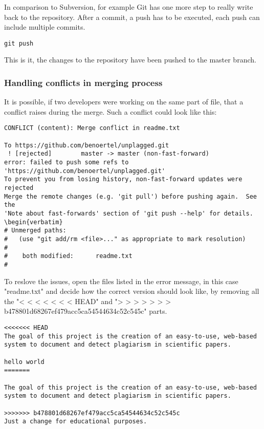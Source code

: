 In comparison to Subversion, for example Git has one more step to really write back to the repository. After a commit, 
a push has to be executed, each push can include multiple commits.

\begin{lstlisting}[caption=Creating branches]
git push
\end{lstlisting}

This is it, the changes to the repository have been pushed to the master branch.

\subsubsection{Handling conflicts in merging process}
It is possible, if two developers were working on the same part of  file, that a conflict raises during the merge. Such 
a conflict could look like this:

\begin{verbatim}
CONFLICT (content): Merge conflict in readme.txt

To https://github.com/benoertel/unplagged.git
 ! [rejected]        master -> master (non-fast-forward)
error: failed to push some refs to 'https://github.com/benoertel/unplagged.git'
To prevent you from losing history, non-fast-forward updates were rejected
Merge the remote changes (e.g. 'git pull') before pushing again.  See the
'Note about fast-forwards' section of 'git push --help' for details.
\begin{verbatim}
# Unmerged paths:
#   (use "git add/rm <file>..." as appropriate to mark resolution)
#
#    both modified:      readme.txt
#
\end{verbatim}
To reslove the issues, open the files listed in the error message, in this case "readme.txt" and decide how the correct version should look like, by removing all the "< < < < < < <  HEAD" and "> > > > > > > b478801d68267ef479acc5ca54544634c52c545c" parts.

\begin{verbatim}
<<<<<<< HEAD
The goal of this project is the creation of an easy-to-use, web-based
system to document and detect plagiarism in scientific papers.

hello world
=======

The goal of this project is the creation of an easy-to-use, web-based
system to document and detect plagiarism in scientific papers.

>>>>>>> b478801d68267ef479acc5ca54544634c52c545c
Just a change for educational purposes.
\end{verbatim}

